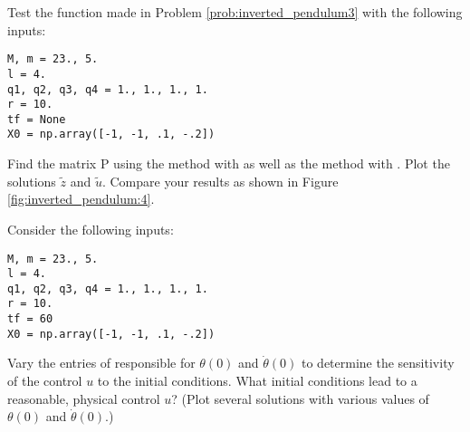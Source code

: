 Test the function made in Problem \eqref{prob:inverted_pendulum3} with the following inputs: 
\begin{lstlisting}
M, m = 23., 5.
l = 4.
q1, q2, q3, q4 = 1., 1., 1., 1.
r = 10.
tf = None
X0 = np.array([-1, -1, .1, -.2])
\end{lstlisting}
Find the matrix P using the  method with  as well as the  method with .
Plot the solutions $\tilde{z}$ and $\tilde{u}$. 
Compare your results as shown in Figure \ref{fig:inverted_pendulum:4}.
\label{prob:inverted_pendulum:4}

Consider the following inputs: 
\begin{lstlisting}
M, m = 23., 5.
l = 4.
q1, q2, q3, q4 = 1., 1., 1., 1.
r = 10.
tf = 60
X0 = np.array([-1, -1, .1, -.2])
\end{lstlisting}
Vary the entries of  responsible for $\theta(0)$ and $\dot{\theta}(0)$ to determine the sensitivity of the control $u$ to the initial conditions.  What initial conditions lead to a reasonable, physical control $u$? (Plot several solutions with various values of $\theta(0)$ and $\dot{\theta}(0)$.)
